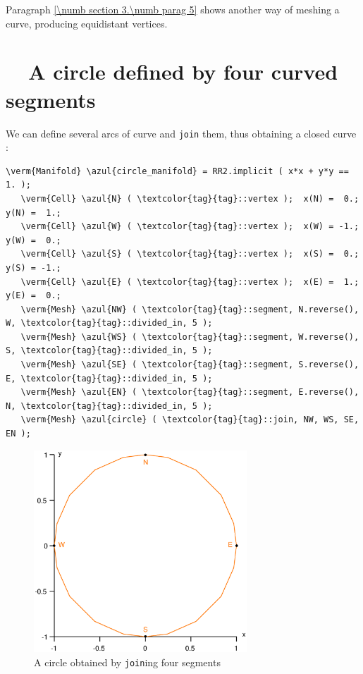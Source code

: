 Paragraph \ref{\numb section 3.\numb parag 5} shows another way of meshing a curve,
producing equidistant vertices.


\section{~~A circle defined by four curved segments}\label{\numb section 2.\numb parag 5}

We can define several arcs of curve and {\small\tt join} them, thus obtaining a closed curve :
\medskip

\begin{Verbatim}[commandchars=\\\{\},formatcom=\small\tt,frame=single,
   label=parag-\ref{\numb section 2.\numb parag 5}.cpp,rulecolor=\color{coment},
   baselinestretch=0.94,framesep=2mm]
   \verm{Manifold} \azul{circle_manifold} = RR2.implicit ( x*x + y*y == 1. );
   \verm{Cell} \azul{N} ( \textcolor{tag}{tag}::vertex );  x(N) =  0.;   y(N) =  1.;
   \verm{Cell} \azul{W} ( \textcolor{tag}{tag}::vertex );  x(W) = -1.;   y(W) =  0.;
   \verm{Cell} \azul{S} ( \textcolor{tag}{tag}::vertex );  x(S) =  0.;   y(S) = -1.;
   \verm{Cell} \azul{E} ( \textcolor{tag}{tag}::vertex );  x(E) =  1.;   y(E) =  0.;
   \verm{Mesh} \azul{NW} ( \textcolor{tag}{tag}::segment, N.reverse(), W, \textcolor{tag}{tag}::divided_in, 5 );
   \verm{Mesh} \azul{WS} ( \textcolor{tag}{tag}::segment, W.reverse(), S, \textcolor{tag}{tag}::divided_in, 5 );
   \verm{Mesh} \azul{SE} ( \textcolor{tag}{tag}::segment, S.reverse(), E, \textcolor{tag}{tag}::divided_in, 5 );
   \verm{Mesh} \azul{EN} ( \textcolor{tag}{tag}::segment, E.reverse(), N, \textcolor{tag}{tag}::divided_in, 5 );
   \verm{Mesh} \azul{circle} ( \textcolor{tag}{tag}::join, NW, WS, SE, EN );
\end{Verbatim}

\begin{figure}[ht] \centering
  \includegraphics[width=80mm]{circle}
  \caption{A circle obtained by {\small\tt join}ing four segments}
  \label{\numb section 2.\numb fig 5}
\end{figure}

